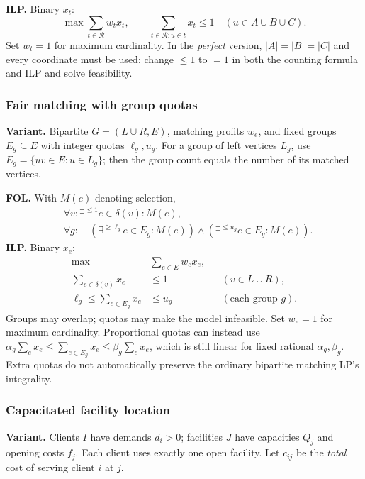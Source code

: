 \textbf{ILP.} Binary $x_t$:
\[
 \max\sum_{t\in\mathcal R}w_tx_t,\qquad
 \sum_{t\in\mathcal R:u\in t}x_t\le1\quad(u\in A\cup B\cup C).
\]
Set $w_t=1$ for maximum cardinality. In the \emph{perfect} version,
$|A|=|B|=|C|$ and every coordinate must be used: change $\le1$ to $=1$
in both the counting formula and ILP and solve feasibility.

\subsubsection{Fair matching with group quotas}\label{form:fair}
\textbf{Variant.} Bipartite $G=(L\cup R,E)$, matching profits $w_e$, and
fixed groups $E_g\subseteq E$ with integer quotas $\ell_g,u_g$.
For a group of left vertices $L_g$, use $E_g=\{uv\in E:u\in L_g\}$;
then the group count equals the number of its matched vertices.

\textbf{FOL.} With $M(e)$ denoting selection,
\[
\begin{aligned}
 &\forall v:\exists^{\le1}e\in\delta(v):M(e),\\
 &\forall g:\quad
 (\exists^{\ge\ell_g}e\in E_g:M(e))\land
 (\exists^{\le u_g}e\in E_g:M(e)).
\end{aligned}
\]
\textbf{ILP.} Binary $x_e$:
\[
\begin{aligned}
 \max\quad &\sum_{e\in E}w_ex_e,\\
 \sum_{e\in\delta(v)}x_e&\le1 &&(v\in L\cup R),\\
 \ell_g\le\sum_{e\in E_g}x_e&\le u_g &&(\text{each group }g).
\end{aligned}
\]
Groups may overlap; quotas may make the model infeasible. Set $w_e=1$ for
maximum cardinality. Proportional quotas can instead use
$\alpha_g\sum_ex_e\le\sum_{e\in E_g}x_e\le\beta_g\sum_ex_e$,
which is still linear for fixed rational $\alpha_g,\beta_g$.
Extra quotas do not automatically preserve the ordinary bipartite matching
LP's integrality.

\subsubsection{Capacitated facility location}\label{form:facility}
\textbf{Variant.} Clients $I$ have demands $d_i>0$; facilities $J$ have
capacities $Q_j$ and opening costs $f_j$. Each client uses exactly one open
facility. Let $c_{ij}$ be the \emph{total} cost of serving client $i$ at $j$.

